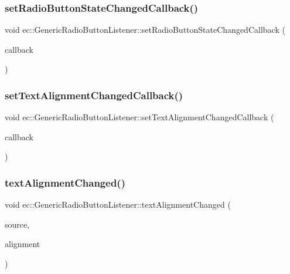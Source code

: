 \subsubsection{\texorpdfstring{set\+Radio\+Button\+State\+Changed\+Callback()}{setRadioButtonStateChangedCallback()}}
{\footnotesize\ttfamily void ec\+::\+Generic\+Radio\+Button\+Listener\+::set\+Radio\+Button\+State\+Changed\+Callback (\begin{DoxyParamCaption}\item[{const \mbox{\hyperlink{classec_1_1_generic_radio_button_listener_ab56b850f44f5d460dff301eef04d430b}{Radio\+Button\+State\+Changed\+\_\+\+Callback}} \&}]{callback }\end{DoxyParamCaption})}

\mbox{\label{classec_1_1_generic_radio_button_listener_a90c75e6db58773ab30347174e40d33ae}} 
\subsubsection{\texorpdfstring{set\+Text\+Alignment\+Changed\+Callback()}{setTextAlignmentChangedCallback()}}
{\footnotesize\ttfamily void ec\+::\+Generic\+Radio\+Button\+Listener\+::set\+Text\+Alignment\+Changed\+Callback (\begin{DoxyParamCaption}\item[{const \mbox{\hyperlink{classec_1_1_generic_radio_button_listener_a3e8ead6a08363f220625d2f856b9213d}{Text\+Alignment\+Changed\+\_\+\+Callback}} \&}]{callback }\end{DoxyParamCaption})}

\mbox{\label{classec_1_1_generic_radio_button_listener_a324705c5155f71e01104399b12a95b8f}} 
\subsubsection{\texorpdfstring{text\+Alignment\+Changed()}{textAlignmentChanged()}}
{\footnotesize\ttfamily void ec\+::\+Generic\+Radio\+Button\+Listener\+::text\+Alignment\+Changed (\begin{DoxyParamCaption}\item[{agui\+::\+Radio\+Button $\ast$}]{source,  }\item[{agui\+::\+Area\+Alignment\+Enum}]{alignment }\end{DoxyParamCaption})\hspace{0.3cm}{\ttfamily [override]}}



